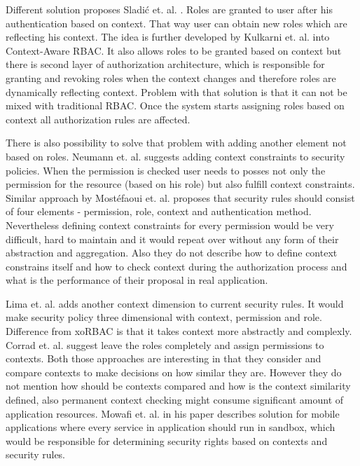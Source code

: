 \documentclass{sig-alternate}
\begin{document}
Different solution proposes Sladi\'c et. al. \cite{contextaccess}. Roles are granted to user after his authentication based on context. That way user can obtain new roles which are reflecting his context. The idea is further developed by Kulkarni et. al. \cite{contextawarerbac} into Context-Aware RBAC. It also allows roles to be granted based on context but there is second layer of authorization architecture, which is responsible for granting and revoking roles when the context changes and therefore roles are dynamically reflecting context. Problem with that solution is that it can not be mixed with traditional RBAC. Once the system starts assigning roles based on context all authorization rules are affected. 

There is also possibility to solve that problem with adding another element not based on roles. Neumann et. al. \cite{xorbac} suggests adding context constraints to security policies. When the permission is checked user needs to posses not only the permission for the resource (based on his role) but also fulfill context constraints. Similar approach by Most\'efaoui et. al. \cite{genericcontext} proposes that security rules should consist of four elements - permission, role, context and authentication method. Nevertheless defining context constraints for every permission would be very difficult, hard to maintain and it would repeat over without any form of their abstraction and aggregation. Also they do not describe how to define context constrains itself and how to check context during the authorization process and what is the performance of their proposal in real application.

Lima et. al. \cite{contextlayer} adds another context dimension to current security rules. It would make security policy three dimensional with context, permission and role. Difference from xoRBAC \cite{xorbac} is that it takes context more abstractly and complexly. Corrad et. al. \cite{ubiscom} suggest leave the roles completely and assign permissions to contexts. Both those approaches are interesting in that they consider and compare contexts to make decisions on how similar they are. However they do not mention how should be contexts compared and how is the context similarity defined, also permanent context checking might consume significant amount of application resources. Mowafi et. al. \cite{contextAwareMobile} in his paper describes solution for mobile applications where every service in application should run in sandbox, which would be responsible for determining security rights based on contexts and security rules.
\end{document}
